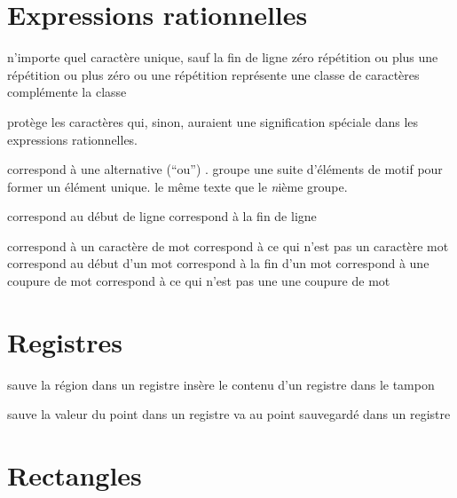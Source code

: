 \section{Expressions rationnelles}

 n'importe quel caract\`ere unique, sauf la fin de ligne
\key{*} z\'ero r\'ep\'etition ou plus
\key{+} une r\'ep\'etition ou plus
 z\'ero ou une r\'ep\'etition
\key{[$\ldots$]} repr\'esente une classe de caract\`eres
\key{[\^{}$\ldots$]} compl\'emente la classe

 prot\`ege les caract\`eres qui, sinon, auraient une
  signification sp\'eciale dans les expressions rationnelles.

\key{$\ldots$\\|$\ldots$\\|$\ldots$} correspond \`a une
alternative (``ou'') .
\key{\\( $\ldots$ \\)} groupe une suite d'\'el\'ements de motif pour
former un \'el\'ement unique.
 le m\^eme texte que le {\it n\/}i\`eme groupe.

\key{\^{}} correspond au d\'ebut de ligne
\key{\$} correspond \`a la fin de ligne

\key{\\w} correspond \`a un caract\`ere de mot
\key{\\W} correspond \`a ce qui n'est pas un caract\`ere mot
\key{\\<} correspond au d\'ebut d'un mot
\key{\\>} correspond \`a la fin d'un mot
\key{\\b} correspond \`a une coupure de mot
\key{\\B} correspond \`a ce qui n'est pas une une coupure de mot

\section{Registres}

 sauve la r\'egion dans un registre
 ins\`ere le contenu d'un registre dans le tampon

 sauve la valeur du point dans un registre
 va au point sauvegard\'e dans un registre

\section{Rectangles}

